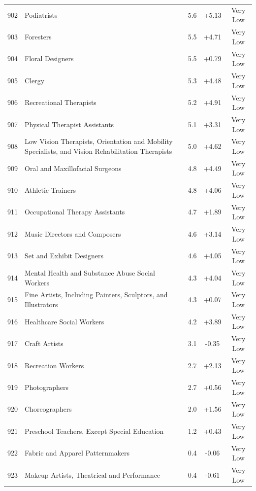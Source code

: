 {\begin{longtable}{rp{7cm}ccc}
902 & Podiatrists & 5.6 & +5.13 & Very Low \\
903 & Foresters & 5.5 & +4.71 & Very Low \\
904 & Floral Designers & 5.5 & +0.79 & Very Low \\
905 & Clergy & 5.3 & +4.48 & Very Low \\
906 & Recreational Therapists & 5.2 & +4.91 & Very Low \\
907 & Physical Therapist Assistants & 5.1 & +3.31 & Very Low \\
908 & Low Vision Therapists, Orientation and Mobility Specialists, and Vision Rehabilitation Therapists & 5.0 & +4.62 & Very Low \\
909 & Oral and Maxillofacial Surgeons & 4.8 & +4.49 & Very Low \\
910 & Athletic Trainers & 4.8 & +4.06 & Very Low \\
911 & Occupational Therapy Assistants & 4.7 & +1.89 & Very Low \\
912 & Music Directors and Composers & 4.6 & +3.14 & Very Low \\
913 & Set and Exhibit Designers & 4.6 & +4.05 & Very Low \\
914 & Mental Health and Substance Abuse Social Workers & 4.3 & +4.04 & Very Low \\
915 & Fine Artists, Including Painters, Sculptors, and Illustrators & 4.3 & +0.07 & Very Low \\
916 & Healthcare Social Workers & 4.2 & +3.89 & Very Low \\
917 & Craft Artists & 3.1 & -0.35 & Very Low \\
918 & Recreation Workers & 2.7 & +2.13 & Very Low \\
919 & Photographers & 2.7 & +0.56 & Very Low \\
920 & Choreographers & 2.0 & +1.56 & Very Low \\
921 & Preschool Teachers, Except Special Education & 1.2 & +0.43 & Very Low \\
922 & Fabric and Apparel Patternmakers & 0.4 & -0.06 & Very Low \\
923 & Makeup Artists, Theatrical and Performance & 0.4 & -0.61 & Very Low \\
\end{longtable}
}
